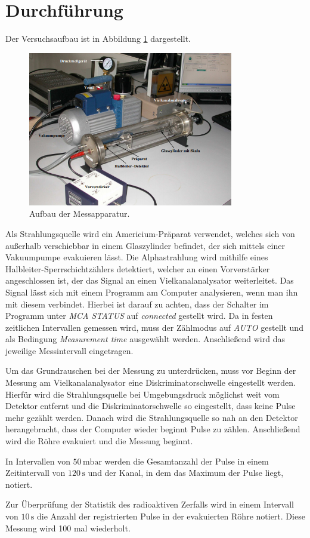 \section{Durchführung}
\label{sec:Durchführung}

Der Versuchsaufbau ist in Abbildung \ref{fig:aufbau} dargestellt.
\begin{figure}[H]
  \centering
  \includegraphics[width=0.8\textwidth]{aufbau.png}
  \caption{Aufbau der Messapparatur\cite{kent}.}
  \label{fig:aufbau}
\end{figure}

Als Strahlungsquelle wird ein Americium-Präparat verwendet, welches sich von außerhalb verschiebbar in 
einem Glaszylinder befindet, der sich mittels einer Vakuumpumpe evakuieren lässt.
Die Alphastrahlung wird mithilfe eines Halbleiter-Sperrschichtzählers detektiert, welcher an
einen Vorverstärker angeschlossen ist, der das Signal an einen Vielkanalanalysator weiterleitet.
Das Signal lässt sich mit einem Programm am Computer analysieren, wenn man ihn mit diesem verbindet.
Hierbei ist darauf zu achten, dass der Schalter im Programm unter \textit{MCA STATUS} auf \textit{connected} gestellt wird.
Da in festen zeitlichen Intervallen gemessen wird, muss der Zählmodus auf \textit{AUTO} gestellt und als Bedingung
\textit{Measurement time} ausgewählt werden. Anschließend wird das jeweilige Messintervall eingetragen.

Um das Grundrauschen bei der Messung zu unterdrücken, muss vor Beginn der Messung
am Vielkanalanalysator eine Diskriminatorschwelle eingestellt werden. Hierfür wird
die Strahlungsquelle bei Umgebungsdruck möglichst weit vom Detektor entfernt und
die Diskriminatorschwelle so eingestellt, dass keine Pulse mehr gezählt werden.
Danach wird die Strahlungsquelle so nah an den Detektor herangebracht, dass der Computer
wieder beginnt Pulse zu zählen. Anschließend wird die Röhre evakuiert und die Messung beginnt.

In Intervallen von $50\,\si{\milli\bar}$ werden die Gesamtanzahl der Pulse in einem Zeitintervall
von $120\,\si{\second}$ und der Kanal, in dem das Maximum der Pulse liegt, notiert.

Zur Überprüfung der Statistik des radioaktiven Zerfalls wird in einem Intervall
von $10\,\si{\second}$ die Anzahl der registrierten Pulse in der evakuierten Röhre notiert. Diese
Messung wird 100 mal wiederholt.